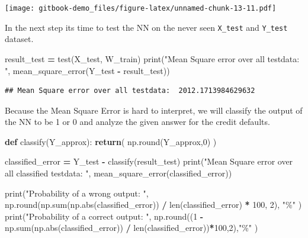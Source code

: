\documentclass[
]{book}
\newenvironment{Shaded}{\begin{snugshade}}{\end{snugshade}}
\newcommand{\BuiltInTok}[1]{#1}
\newcommand{\ControlFlowTok}[1]{\textcolor[rgb]{0.13,0.29,0.53}{\textbf{#1}}}
\newcommand{\DecValTok}[1]{\textcolor[rgb]{0.00,0.00,0.81}{#1}}
\newcommand{\KeywordTok}[1]{\textcolor[rgb]{0.13,0.29,0.53}{\textbf{#1}}}
\newcommand{\NormalTok}[1]{#1}
\newcommand{\OperatorTok}[1]{\textcolor[rgb]{0.81,0.36,0.00}{\textbf{#1}}}
\newcommand{\StringTok}[1]{\textcolor[rgb]{0.31,0.60,0.02}{#1}}
\begin{document}
\texttt{[image: gitbook-demo\_files/figure-latex/unnamed-chunk-13-11.pdf]}

In the next step its time to test the NN on the never seen \texttt{X\_test} and \texttt{Y\_test} dataset.

\begin{Shaded}
\begin{Highlighting}[]
\NormalTok{result\_test }\OperatorTok{=}\NormalTok{ test(X\_test, W\_train)}
\BuiltInTok{print}\NormalTok{(}\StringTok{"Mean Square error over all testdata: "}\NormalTok{, mean\_square\_error(Y\_test }\OperatorTok{{-}}\NormalTok{ result\_test))}
\end{Highlighting}
\end{Shaded}

\begin{verbatim}
## Mean Square error over all testdata:  2012.1713984629632
\end{verbatim}

Because the Mean Square Error is hard to interpret, we will classify the output of the NN to be 1 or 0 and analyze the given answer for the credit defaults.

\begin{Shaded}
\begin{Highlighting}[]
\KeywordTok{def}\NormalTok{ classify(Y\_approx):}
  \ControlFlowTok{return}\NormalTok{( np.}\BuiltInTok{round}\NormalTok{(Y\_approx,}\DecValTok{0}\NormalTok{) )}

\NormalTok{classified\_error }\OperatorTok{=}\NormalTok{ Y\_test }\OperatorTok{{-}}\NormalTok{ classify(result\_test)}
\BuiltInTok{print}\NormalTok{(}\StringTok{"Mean Square error over all classified testdata: "}\NormalTok{, mean\_square\_error(classified\_error))}

\BuiltInTok{print}\NormalTok{(}\StringTok{"Probability of a wrong output: "}\NormalTok{, np.}\BuiltInTok{round}\NormalTok{(np.}\BuiltInTok{sum}\NormalTok{(np.}\BuiltInTok{abs}\NormalTok{(classified\_error)) }\OperatorTok{/} \BuiltInTok{len}\NormalTok{(classified\_error) }\OperatorTok{*} \DecValTok{100}\NormalTok{, }\DecValTok{2}\NormalTok{), }\StringTok{"\%"}\NormalTok{ )}
\BuiltInTok{print}\NormalTok{(}\StringTok{"Probability of a correct output: "}\NormalTok{, np.}\BuiltInTok{round}\NormalTok{((}\DecValTok{1} \OperatorTok{{-}}\NormalTok{ np.}\BuiltInTok{sum}\NormalTok{(np.}\BuiltInTok{abs}\NormalTok{(classified\_error)) }\OperatorTok{/} \BuiltInTok{len}\NormalTok{(classified\_error))}\OperatorTok{*}\DecValTok{100}\NormalTok{,}\DecValTok{2}\NormalTok{),}\StringTok{"\%"}\NormalTok{ )}
\end{Highlighting}
\end{Shaded}
\end{document}
